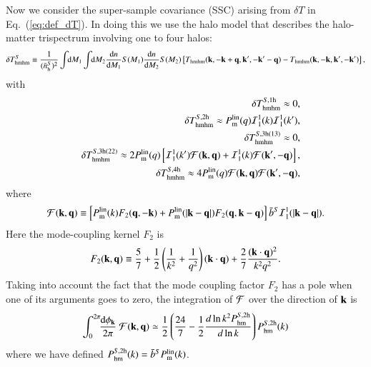 \documentclass[onecolumn,notitlepage,showpacs,amsmath,amssymb,prd,floatfix]{revtex4-1}
\newcommand{\bk}{{\bf k}}
\newcommand{\bq}{{\bf q}}
\newcommand{\dr}{\mathrm{d}}
\newcommand{\bnhs}{\bar{n}_{\rm h}^S}
\newcommand{\pml}{P^{\rm lin}_{\rm m}}
\begin{document}
Now we consider the super-sample covariance (SSC) arising from $\delta
T$ in Eq.~(\ref{eq:def_dT}). In doing this we use the halo model that
describes the halo-matter trispectrum involving one to four halos:
%
\begin{equation}
 \delta T^S_{\rm hmhm}
  \equiv \frac{1}{(\bnhs)^2}\int\!\!\dr M_1\int\!\!\dr
  M_2\frac{\dr n}{\dr M_1} S(M_1)\frac{\dr n}{\dr M_2}S(M_2)
  \left[
   T_{\rm hmhm}(\bk,-\bk+\bq,\bk',-\bk'-\bq) -
      T_{\rm hmhm}(\bk,-\bk,\bk',-\bk')
	   \right],
  \label{eq:def_barT}
\end{equation}
%
with
%
\begin{eqnarray}
 &&\delta T^{S,{\rm 1h}}_{\rm hmhm}\approx 0,\nonumber\\
 &&\delta T^{S, {\rm 2h}}_{\rm
  hmhm}\approx \pml(q){\cal I}^{1}_1(k){\cal I}^{1}_1(k'),\nonumber\\
 &&\delta T^{S,{\rm 3h(13)}}_{\rm hmhm}\approx 0,\nonumber\\
 &&\delta T^{S, {\rm 3h(22)}}_{\rm hmhm}\approx 2\pml(q)
\left[{\cal I}^{1}_1(k'){\cal
 F}(\bk,\bq)+{\cal I}^{1}_1(k){\cal F}(\bk',-\bq)\right],\nonumber\\
 &&\delta T^{S, {\rm 4h}}_{\rm hmhm}\approx4\pml(q){\cal
  F}(\bk,\bq){\cal F}(\bk',-\bq),
\end{eqnarray}
%
where
%
\begin{equation}
{\cal F}(\bk,\bq)\equiv
 \left[\pml(k)F_2(\bq,-\bk)+\pml(|\bk-\bq|)F_2(\bq,\bk-\bq)\right]\bar{b}^S{\cal
 I}^{1}_1(|\bk-\bq|).
\end{equation}
%
Here the mode-coupling kernel $F_2$ is
%
\begin{equation}
 F_2(\bk,\bq)\equiv \frac{5}{7}+\frac{1}{2}\left(\frac{1}{k^2}+\frac{1}{q^2}\right)
  (\bk\cdot\bq)+\frac{2}{7}\frac{(\bk\cdot\bq)^2}{k^2q^2}.
\end{equation}
%
Taking into account the fact that the mode coupling factor $F_2$ has a
pole when one of its arguments goes to zero, the integration of ${\cal
F}$ over the direction of $\bk$ is
%
\begin{equation}
 \int_0^{2\pi}\!\!\frac{\dr\phi_\bk}{2\pi}~{\cal F}(\bk,\bq)\simeq
  \frac{1}{2}
  \left(\frac{24}{7}-\frac{1}{2}\frac{d\ln k^2P^{S, {\rm 2h}}_{\rm hm}}{d\ln
   k}\right) P^{S,{\rm 2h}}_{\rm hm}(k)
  \label{eq:def_F}
\end{equation}
%
where we have defined $P^{S,{\rm 2h}}_{\rm hm}(k)=\bar {b}^S\pml(k)$.
\end{document}
